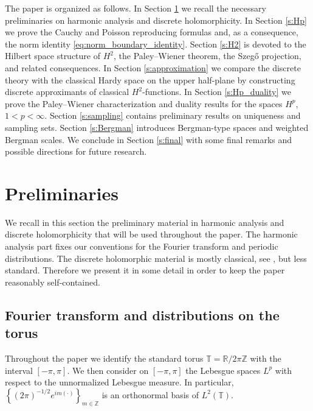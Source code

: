 \documentclass[12pt,a4paper,reqno]{amsart}
\theoremstyle{definition}
\theoremstyle{definition}\newtheorem{defn}[thm]{Definition}
\begin{document}
    The paper is organized as follows. In Section \ref{s:preliminaries} we recall the necessary preliminaries on harmonic analysis and discrete holomorphicity. In Section \ref{s:Hp} we prove the Cauchy and Poisson reproducing formulas and, as a consequence, the norm identity \eqref{eq:norm_boundary_identity}. Section \ref{s:H2} is devoted to the Hilbert space structure of $H^2$, the Paley--Wiener theorem, the Szeg\H o projection, and related consequences. In Section \ref{s:approximation} we compare the discrete theory with the classical Hardy space on the upper half-plane by constructing discrete approximants of classical $H^2$-functions. In Section \ref{s:Hp_duality} we prove the Paley–Wiener characterization and duality results for the spaces $H^p$, $1<p<\infty$. Section \ref{s:sampling} contains preliminary results on uniqueness and sampling sets. Section \ref{s:Bergman} introduces Bergman-type spaces and weighted Bergman scales. We conclude in Section \ref{s:final} with some final remarks and possible directions for future research.
    
    
    
    \section{Preliminaries}\label{s:preliminaries}
    We recall in this section the preliminary material in harmonic analysis and discrete holomorphicity that will be used throughout the paper. The harmonic analysis part fixes our conventions for the Fourier transform and periodic distributions. The discrete holomorphic material is mostly classical, see \cite{D}, but less standard. Therefore we present it in some detail in order to keep the paper reasonably self-contained.
    \subsection{Fourier transform and distributions on the torus}\label{ss:distributions}
    Throughout the paper we  identify the standard torus $
    \mathbb T=\mathbb R/2\pi\mathbb Z$ 
    with the interval $[-\pi,\pi]$. We then consider on $[-\pi,\pi]$ the Lebesgue spaces $L^p$ with respect to the  unnormalized Lebesgue measure. In particular, $
    \left\{(2\pi)^{-1/2}e^{im(\cdot)}\right\}_{m\in\mathbb Z}
    $ 
    is an orthonormal basis of $L^2(\mathbb T)$.
    
\end{document}

